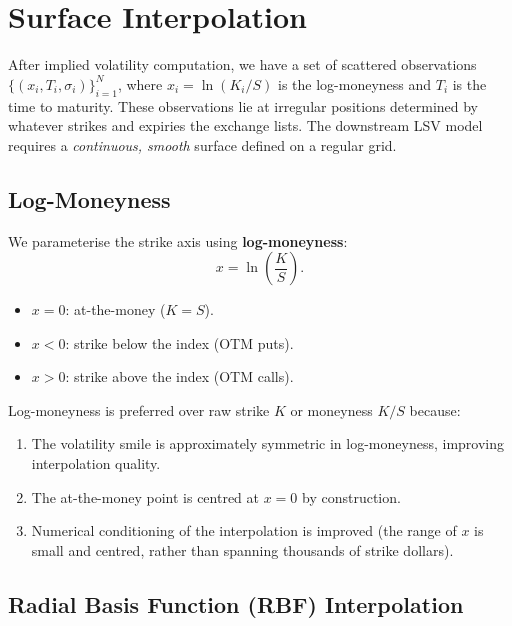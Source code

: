 \documentclass[12pt, a4paper]{article}
\begin{document}
\section{Surface Interpolation}
\label{sec:interpolation}

After implied volatility computation, we have a set of scattered observations
$\{(x_i, T_i, \sigma_i)\}_{i=1}^{N}$, where $x_i = \ln(K_i / S)$ is the
log-moneyness and $T_i$ is the time to maturity. These observations lie at
irregular positions determined by whatever strikes and expiries the exchange
lists. The downstream LSV model requires a \emph{continuous, smooth} surface
defined on a regular grid.

\subsection{Log-Moneyness}
\label{sec:logm}

We parameterise the strike axis using \textbf{log-moneyness}:
\begin{equation}
    x = \ln\!\left(\frac{K}{S}\right).
    \label{eq:log_moneyness}
\end{equation}
\begin{itemize}[nosep]
    \item $x = 0$: at-the-money ($K = S$).
    \item $x < 0$: strike below the index (OTM puts).
    \item $x > 0$: strike above the index (OTM calls).
\end{itemize}

Log-moneyness is preferred over raw strike $K$ or moneyness $K/S$ because:
\begin{enumerate}[nosep]
    \item The volatility smile is approximately symmetric in log-moneyness,
          improving interpolation quality.
    \item The at-the-money point is centred at $x = 0$ by construction.
    \item Numerical conditioning of the interpolation is improved (the range of
          $x$ is small and centred, rather than spanning thousands of strike
          dollars).
\end{enumerate}

\subsection{Radial Basis Function (RBF) Interpolation}
\label{sec:rbf}
\end{document}

